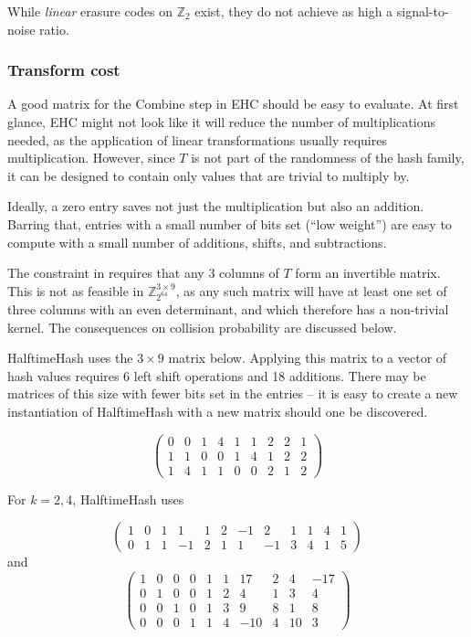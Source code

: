 \documentclass[sigconf, nonacm]{acmart}
\newcommand{\ints}{\mathbb{Z}}
\begin{document}
While {\em linear} erasure codes on $\ints_2$ exist, they do not achieve as high a signal-to-noise ratio.

\subsubsection{Transform cost}

A good matrix for the Combine step in EHC should be easy to evaluate.
At first glance, EHC might not look like it will reduce the number of multiplications needed, as the application of linear transformations usually requires multiplication.
However, since $T$ is not part of the randomness of the hash family, it can be designed to contain only values that are trivial to multiply by.

Ideally, a zero entry saves not just the multiplication but also an addition.
Barring that, entries with a small number of bits set (``low weight'') are easy to compute with a small number of additions, shifts, and subtractions.

The constraint in \cite{ehc-nandi} requires that any 3 columns of $T$ form an invertible matrix.
This is not as feasible in $\ints_{2^{64}}^{3 \times 9}$, as any such matrix will have at least one set of three columns with an even determinant, and which therefore has a non-trivial kernel.
The consequences on collision probability are discussed below.

HalftimeHash uses the $3 \times 9$ matrix below.
Applying this matrix to a vector of hash values requires 6 left shift operations and 18 additions.
There may be matrices of this size with fewer bits set in the entries -- it is easy to create a new instantiation of HalftimeHash with a new matrix should one be discovered.

\begin{displaymath}
  \left(
\begin{array}{rrrrrrrrr}
  0 & 0 & 1 & 4 & 1 & 1 & 2 & 2 & 1\\
  1 & 1 & 0 & 0 & 1 & 4 & 1 & 2 & 2\\
  1 & 4 & 1 & 1 & 0 & 0 & 2 & 1 & 2
\end{array}
\right)
\end{displaymath}

For $k = 2, 4$, HalftimeHash uses

\[
\left(
\begin{array}{rrrrrrrrrrrr}
  1 & 0 & 1 & 1 & 1 & 2 & -1 & 2 & 1 & 1 & 4 & 1\\
  0 & 1 & 1 & -1 & 2 & 1 & 1 & -1 & 3 & 4 & 1 & 5
\end{array}
\right)
\]
and
\[
\left(
\begin{array}{rrrrrrrrrr}
  1 &  0 &   0&   0&   1&   1&  17&   2&   4& -17 \\
  0  & 1&   0  & 0&   1  & 2&   4  & 1&   3  & 4\\
  0 &  0 &  1 &  0 &  1 &  3 &  9 &  8 &  1 &  8\\
  0&   0  & 0&   1  & 1&   4 &-10&   4  &10&   3
\end{array}
\right)
\]
\end{document}
